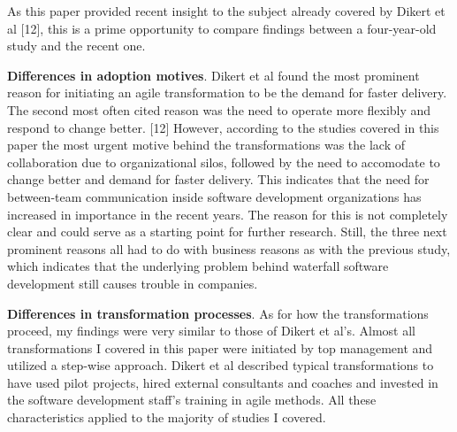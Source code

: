 As this paper provided recent insight to the subject already covered by
Dikert et al [12], this is a prime opportunity to compare findings between a
four-year-old study and the recent one.


{\bfseries Differences in adoption motives}. Dikert et al found the
most prominent reason for initiating an agile transformation to be the
demand for faster delivery. The second most often cited reason was
the need to operate more flexibly and respond to change better. [12]
However, according to the studies covered in this paper the most urgent
motive behind the transformations was the lack of collaboration due
to organizational silos, followed by the need to accomodate to change
better and demand for faster delivery. This indicates that the need for
between-team communication inside software development organizations
has increased in importance in the recent years. The reason for this is
not completely clear and could serve as a starting point for further
research. Still, the three next prominent reasons all had to do with
business reasons as with the previous study, which indicates that the
underlying problem behind waterfall software development still causes
trouble in companies.


{\bfseries Differences in transformation processes}. As for how the
transformations proceed, my findings were very similar to those of
Dikert et al's. Almost all transformations I covered in this paper were
initiated by top management and utilized a step-wise approach. Dikert
et al described typical transformations to have used pilot projects,
hired external consultants and coaches and invested in the software
development staff's training in agile methods. All these characteristics
applied to the majority of studies I covered.
